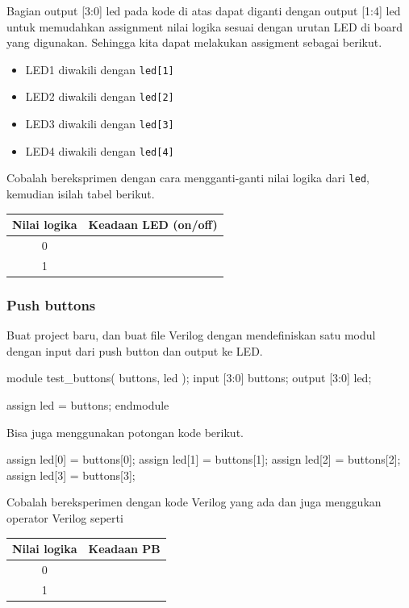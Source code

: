 Bagian {\sf output [3:0] led} pada kode di atas dapat diganti
dengan {\sf output [1:4] led} untuk memudahkan assignment nilai logika
sesuai dengan urutan LED di board yang digunakan. Sehingga kita dapat
melakukan assigment sebagai berikut.
\begin{itemize}
\item LED1 diwakili dengan {\tt led[1]}
\item LED2 diwakili dengan {\tt led[2]}
\item LED3 diwakili dengan {\tt led[3]}
\item LED4 diwakili dengan {\tt led[4]}
\end{itemize}

Cobalah bereksprimen dengan cara mengganti-ganti nilai logika
dari {\tt led}, kemudian isilah tabel berikut.

\begin{table}[H]
\centering
\begin{tabular}{|c|c|}
\hline
Nilai logika & Keadaan LED (on/off) \\
\hline
0 & \\
1 & \\
\hline
\end{tabular}
\par
\end{table}


\subsubsection{Push buttons}

Buat project baru, dan buat file Verilog dengan mendefiniskan satu modul
dengan input dari push button dan output ke LED.
\begin{verilogcode}
module test_buttons( buttons, led );
  input  [3:0] buttons;
  output [3:0] led;

  assign led = buttons;
endmodule
\end{verilogcode}

Bisa juga menggunakan potongan kode berikut.
\begin{verilogcode}
  assign led[0] = buttons[0];
  assign led[1] = buttons[1];
  assign led[2] = buttons[2];
  assign led[3] = buttons[3];
\end{verilogcode}

Cobalah bereksperimen dengan kode Verilog yang ada dan juga menggukan operator Verilog
seperti 

\begin{table}[H]
\centering
\begin{tabular}{|c|c|}
\hline
Nilai logika & Keadaan PB \\
\hline
0 & \\
1 & \\
\hline
\end{tabular}
\par
\end{table}

